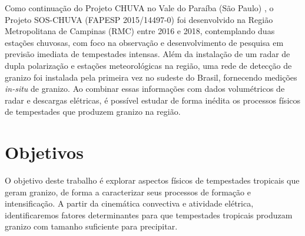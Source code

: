 Como continuação do Projeto CHUVA no Vale do Paraíba (São Paulo) \cite{Machado2014}, o Projeto SOS-CHUVA (FAPESP 2015/14497-0) foi desenvolvido na Região Metropolitana de Campinas (RMC) entre 2016 e 2018, contemplando duas estações chuvosas, com foco na observação e desenvolvimento de pesquisa em previsão imediata de tempestades intensas. Além da instalação de um radar de dupla polarização e estações meteorológicas na região, uma rede de detecção de granizo foi instalada pela primeira vez no sudeste do Brasil, fornecendo medições \textit{in-situ} de granizo. Ao combinar essas informações com dados volumétricos de radar e descargas elétricas, é possível estudar de forma inédita os processos físicos de tempestades que produzem granizo na região.


\section{Objetivos}

O objetivo deste trabalho é explorar aspectos físicos de tempestades tropicais que geram granizo, de forma a caracterizar seus processos de formação e intensificação. A partir da cinemática convectiva e atividade elétrica, identificaremos fatores determinantes para que tempestades tropicais produzam granizo com tamanho suficiente para precipitar.